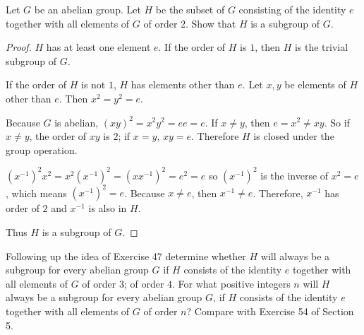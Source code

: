 \newpage
\begin{exercise}
    Let $G$ be an abelian group. Let $H$ be the subset of $G$ consisting of the identity $e$ together with all elements of $G$ of order $2$. Show that $H$ is a subgroup of $G$.
\end{exercise}

\begin{proof}
    $H$ has at least one element $e$. If the order of $H$ is $1$, then $H$ is the trivial subgroup of $G$.

    If the order of $H$ is not $1$, $H$ has elements other than $e$. Let $x, y$ be elements of $H$ other than $e$. Then $x^{2} = y^{2} = e$.

    Because $G$ is abelian, ${(xy)}^{2} = x^{2}y^{2} = ee = e$. If $x\ne y$, then $e = x^{2} \ne xy$. So if $x\ne y$, the order of $xy$ is $2$; if $x = y$, $xy = e$. Therefore $H$ is closed under the group operation.

    ${(x^{-1})}^{2}x^{2} = x^{2}{(x^{-1})}^{2} = {(xx^{-1})}^{2} = e^{2} = e$ so ${(x^{-1})}^{2}$ is the inverse of $x^{2} = e$, which means ${(x^{-1})}^{2} = e$. Because $x\ne e$, then $x^{-1}\ne e$. Therefore, $x^{-1}$ has order of $2$ and $x^{-1}$ is also in $H$.

    Thus $H$ is a subgroup of $G$.
\end{proof}

\newpage
\begin{exercise}
    Following up the idea of Exercise 47 determine whether $H$ will always be a subgroup for every abelian group $G$ if $H$ consists of the identity $e$ together with all elements of $G$ of order $3$; of order $4$. For what positive integers $n$ will $H$ always be a subgroup for every abelian group $G$, if $H$ consists of the identity $e$ together with all elements of $G$ of order $n$? Compare with Exercise 54 of Section 5.
\end{exercise}

